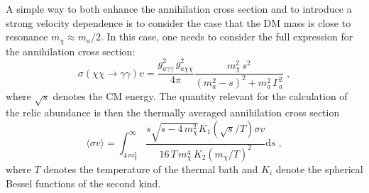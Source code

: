 \documentclass[11pt,a4paper]{article}
\newcommand{\ga}{g_{a\gamma\gamma}}
\begin{document}
A simple way to both enhance the annihilation cross section and to introduce a strong velocity dependence is to consider the case that the DM mass is close to resonance \hbox{$m_\chi \approx m_a / 2$}. In this case, one needs to consider the full expression for the annihilation cross section:
\begin{equation}
\sigma(\chi \chi \to \gamma \gamma) v = \frac{\ga^2 \, g_{a\chi\chi}^2}{4 \pi} \frac{m_\chi^2 \, s^2}{(m_a^2 - s)^2 + 
  m_a^2 \, \Gamma_a^2} \; ,
  \label{eq:sigv}
\end{equation}
where $\sqrt{s}$ denotes the CM energy. The quantity relevant for the calculation of the relic abundance is then the thermally averaged annihilation cross section~\cite{Gondolo:1990dk}
\begin{equation}
\langle \sigma v \rangle = \int_{4 \, m_\chi^2}^\infty \frac{s \sqrt{s - 4 \, m_\chi^2} K_1(\sqrt{s} / T) \sigma v}{16 \, T \, m_\chi^4 \, K_2(m_\chi/T)^2} \mathrm{d}s \; , \label{eq:sigthermal}
\end{equation}
where $T$ denotes the temperature of the thermal bath and $K_i$ denote the spherical Bessel functions of the second kind.
\end{document}

